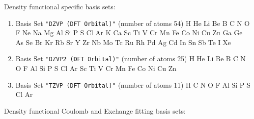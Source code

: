 Density functional specific basis sets:

\begin{enumerate}

\item Basis Set \verb#"DZVP (DFT Orbital)"# (number of atoms 54)  \newline
  H He Li Be B C N O F Ne Na Mg Al Si P S Cl Ar K Ca Sc Ti V Cr Mn
 Fe Co Ni Cu Zn Ga Ge As Se Br Kr Rb Sr Y Zr Nb Mo Tc Ru Rh Pd Ag Cd In Sn
 Sb Te I Xe

\item Basis Set \verb#"DZVP2 (DFT Orbital)"# (number of atoms 25)  \newline
  H He Li Be B C N O F Al Si P S Cl Ar Sc Ti V Cr Mn Fe Co Ni Cu Zn

\item Basis Set \verb#"TZVP (DFT Orbital)"# (number of atoms 11)  \newline
  H C N O F Al Si P S Cl Ar

\end{enumerate}

Density functional Coulomb and Exchange fitting basis sets:


